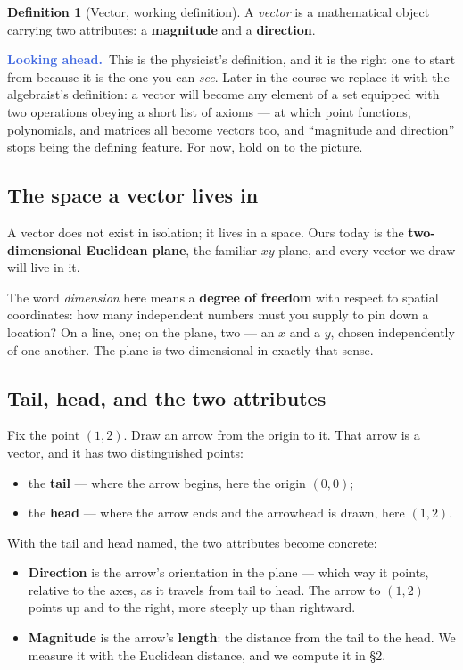 \documentclass[11pt]{article}
\theoremstyle{definition}
\newtheorem{defn}{Definition}
\theoremstyle{remark}
\newcommand{\lookahead}{\par\smallskip\noindent
  \textbf{\sffamily\textcolor{RoyalBlue}{Looking ahead.}}\ \ignorespaces}
\begin{document}
\begin{defn}[Vector, working definition]
A \emph{vector} is a mathematical object carrying two attributes:
a \textbf{magnitude} and a \textbf{direction}.
\end{defn}

\lookahead This is the physicist's definition, and it is the right one to start
from because it is the one you can \emph{see}. Later in the course we replace it
with the algebraist's definition: a vector will become any element of a set
equipped with two operations obeying a short list of axioms --- at which point
functions, polynomials, and matrices all become vectors too, and ``magnitude and
direction'' stops being the defining feature. For now, hold on to the picture.

\subsection*{The space a vector lives in}
A vector does not exist in isolation; it lives in a space. Ours today is the
\textbf{two-dimensional Euclidean plane}, the familiar $xy$-plane, and every
vector we draw will live in it.

The word \emph{dimension} here means a \textbf{degree of freedom} with respect
to spatial coordinates: how many independent numbers must you supply to pin down
a location? On a line, one; on the plane, two --- an $x$ and a $y$, chosen
independently of one another. The plane is two-dimensional in exactly that
sense.

\subsection*{Tail, head, and the two attributes}
Fix the point $(1,2)$. Draw an arrow from the origin to it. That arrow is a
vector, and it has two distinguished points:

\begin{itemize}[leftmargin=1.4em,itemsep=2pt]
  \item the \textbf{tail} --- where the arrow begins, here the origin $(0,0)$;
  \item the \textbf{head} --- where the arrow ends and the arrowhead is drawn,
        here $(1,2)$.
\end{itemize}

\noindent With the tail and head named, the two attributes become concrete:

\begin{itemize}[leftmargin=1.4em,itemsep=2pt]
  \item \textbf{Direction} is the arrow's orientation in the plane --- which way
        it points, relative to the axes, as it travels from tail to head. The
        arrow to $(1,2)$ points up and to the right, more steeply up than
        rightward.
  \item \textbf{Magnitude} is the arrow's \textbf{length}: the distance from the
        tail to the head. We measure it with the Euclidean distance, and we
        compute it in \S2.
\end{itemize}
\end{document}
